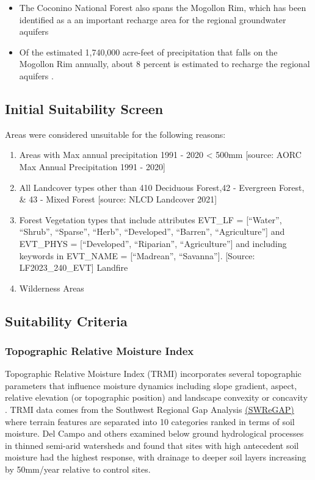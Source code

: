 \documentclass[
  number]{elsarticle}
\begin{document}
\begin{itemize}
\item
  The Coconino National Forest also spans the Mogollon Rim, which has
  been identified as a an important recharge area for the regional
  groundwater aquifers
\item
  Of the estimated 1,740,000 acre-feet of precipitation that falls on
  the Mogollon Rim annually, about 8 percent is estimated to recharge
  the regional aquifers \citep{parker2005}.
\end{itemize}

\subsection{Initial Suitability
Screen}\label{initial-suitability-screen}

Areas were considered unsuitable for the following reasons:

\begin{enumerate}
\def\labelenumi{\arabic{enumi}.}
\item
  Areas with Max annual precipitation 1991 - 2020 \textless{} 500mm
  {[}source: AORC Max Annual Precipitation 1991 - 2020{]}
\item
  All Landcover types other than 410 Deciduous Forest,42 - Evergreen
  Forest, \& 43 - Mixed Forest {[}source: NLCD Landcover 2021{]}
\item
  Forest Vegetation types that include attributes EVT\_LF =
  {[}``Water'', ``Shrub'', ``Sparse'', ``Herb'', ``Developed'',
  ``Barren'', ``Agriculture''{]} and EVT\_PHYS = {[}``Developed'',
  ``Riparian'', ``Agriculture''{]} and including keywords in EVT\_NAME =
  {[}``Madrean'', ``Savanna''{]}. {[}Source: LF2023\_240\_EVT{]}
  Landfire
\item
  Wilderness Areas
\end{enumerate}

\subsection{Suitability Criteria}\label{suitability-criteria}

\subsubsection{Topographic Relative Moisture
Index}\label{topographic-relative-moisture-index}

Topographic Relative Moisture Index (TRMI) incorporates several
topographic parameters that influence moisture dynamics including slope
gradient, aspect, relative elevation (or topographic position) and
landscape convexity or concavity \citep{parker1982}. TRMI data comes
from the Southwest Regional Gap Analysis
\href{https://swregap.org/data/}{(SWReGAP)} where terrain features are
separated into 10 categories ranked in terms of soil moisture. Del Campo
and others \citep{del_campo_effectiveness_2019} examined below ground
hydrological processes in thinned semi-arid watersheds and found that
sites with high antecedent soil moisture had the highest response, with
drainage to deeper soil layers increasing by 50mm/year relative to
control sites.
\end{document}
